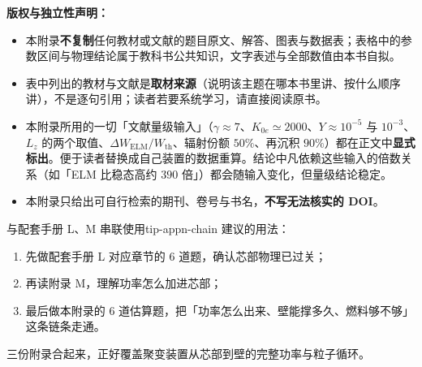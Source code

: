 \textbf{版权与独立性声明：}
\begin{itemize}
\item 本附录\textbf{不复制}任何教材或文献的题目原文、解答、图表与数据表；表格中的参数区间与物理结论属于教科书公共知识，文字表述与全部数值由本书自拟。
\item 表中列出的教材与文献是\textbf{取材来源}（说明该主题在哪本书里讲、按什么顺序讲），不是逐句引用；读者若要系统学习，请直接阅读原书。
\item 本附录所用的一切「文献量级输入」（$\gamma\approx7$、$K_{0e}\simeq2000$、$Y\approx10^{-5}$ 与 $10^{-3}$、$L_z$ 的两个取值、$\Delta W_{\mathrm{ELM}}/W_{\mathrm{th}}$、辐射份额 $50\%$、再沉积 $90\%$）都在正文中\textbf{显式标出}。便于读者替换成自己装置的数据重算。结论中凡依赖这些输入的倍数关系（如「ELM 比稳态高约 $390$ 倍」）都会随输入变化，但量级结论稳定。
\item 本附录只给出可自行检索的期刊、卷号与书名，\textbf{不写无法核实的 DOI}。
\end{itemize}

\begin{tip}{与配套手册 L、M 串联使用}{tip-appn-chain}
建议的用法：
\begin{enumerate}[nosep,leftmargin=1.6em]
  \item 先做配套手册 L 对应章节的 6 道题，确认芯部物理已过关；
  \item 再读附录 M，理解功率怎么加进芯部；
  \item 最后做本附录的 6 道估算题，把「功率怎么出来、壁能撑多久、燃料够不够」这条链条走通。
\end{enumerate}
三份附录合起来，正好覆盖聚变装置从芯部到壁的完整功率与粒子循环。
\end{tip}
\endgroup
